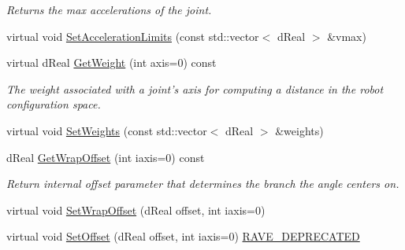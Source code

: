\begin{DoxyCompactItemize}
\begin{DoxyCompactList}\small\item\em Returns the max accelerations of the joint. \item\end{DoxyCompactList}\item 
virtual void \hyperlink{classOpenRAVE_1_1KinBody_1_1Joint_a66a3b9657e5dfc13903c47664445fb93}{SetAccelerationLimits} (const std::vector$<$ dReal $>$ \&vmax)
\item 
\hypertarget{classOpenRAVE_1_1KinBody_1_1Joint_aa305a00e9865044b4f6c2ec81d00d6d9}{
virtual dReal \hyperlink{classOpenRAVE_1_1KinBody_1_1Joint_aa305a00e9865044b4f6c2ec81d00d6d9}{GetWeight} (int axis=0) const }
\label{classOpenRAVE_1_1KinBody_1_1Joint_aa305a00e9865044b4f6c2ec81d00d6d9}

\begin{DoxyCompactList}\small\item\em The weight associated with a joint's axis for computing a distance in the robot configuration space. \item\end{DoxyCompactList}\item 
virtual void \hyperlink{classOpenRAVE_1_1KinBody_1_1Joint_a7b884c5900625a5d49951afaf67fcc27}{SetWeights} (const std::vector$<$ dReal $>$ \&weights)
\item 
dReal \hyperlink{classOpenRAVE_1_1KinBody_1_1Joint_a9dede60d3c61a885dc1b98fe86e85727}{GetWrapOffset} (int iaxis=0) const 
\begin{DoxyCompactList}\small\item\em Return internal offset parameter that determines the branch the angle centers on. \item\end{DoxyCompactList}\item 
virtual void \hyperlink{classOpenRAVE_1_1KinBody_1_1Joint_a717d10686a55fc7c870effe21a3fcb3d}{SetWrapOffset} (dReal offset, int iaxis=0)
\item 
virtual void \hyperlink{classOpenRAVE_1_1KinBody_1_1Joint_ad33ede63ec196d7af2a3d5ea4e2e5c60}{SetOffset} (dReal offset, int iaxis=0) \hyperlink{namespaceOpenRAVE_af23fc4c2c72950a8c02f38ef71680bc6}{RAVE\_\-DEPRECATED}
\end{DoxyCompactItemize}
